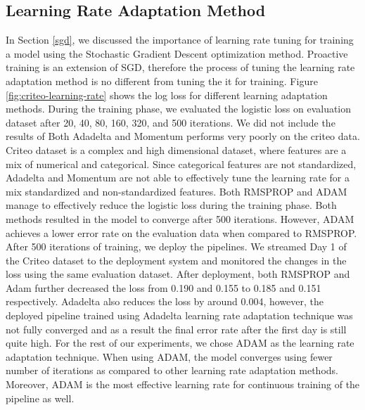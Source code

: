 \subsection{Learning Rate Adaptation Method}
In Section \ref{sgd}, we discussed the importance of learning rate tuning for training a model using the Stochastic Gradient Descent optimization method.
Proactive training is an extension of SGD, therefore the process of tuning the learning rate adaptation method is no different from tuning the it for training.
Figure \ref{fig:criteo-learning-rate} shows the log loss for different learning adaptation methods. 
During the training phase, we evaluated the logistic loss on evaluation dataset after 20, 40, 80, 160, 320, and 500 iterations.
We did not include the results of 
Both Adadelta and Momentum performs very poorly on the criteo data.
Criteo dataset is a complex and high dimensional dataset, where features are a mix of numerical and categorical.
Since categorical features are not standardized, Adadelta and Momentum are not able to effectively tune the learning rate for a mix standardized and non-standardized features.
Both RMSPROP and ADAM manage to effectively reduce the logistic loss during the training phase.
Both methods resulted in the model to converge after 500 iterations.
However, ADAM achieves a lower error rate on the evaluation data when compared to RMSPROP.
After 500 iterations of training, we deploy the pipelines.
We streamed Day 1 of the Criteo dataset to the deployment system and monitored the changes in the loss using the same evaluation dataset.
After deployment, both RMSPROP and Adam further decreased the loss from 0.190 and 0.155 to 0.185 and 0.151 respectively.
Adadelta also reduces the loss by around 0.004, however, the deployed pipeline trained using Adadelta learning rate adaptation technique was not fully converged and as a result the final error rate after the first day is still quite high.
For the rest of our experiments, we chose ADAM as the learning rate adaptation technique.
When using ADAM, the model converges using fewer number of iterations as compared to other learning rate adaptation methods.
Moreover, ADAM is the most effective learning rate for continuous training of the pipeline as well.

